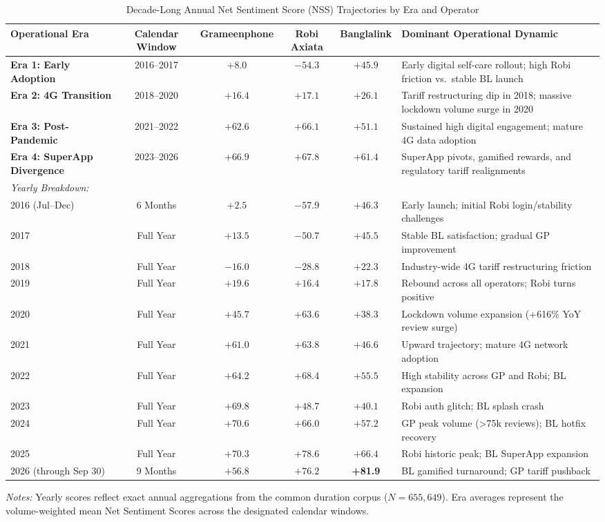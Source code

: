 \documentclass[review,12pt,authoryear]{elsarticle}
\begin{document}
\begin{table}[t]
\centering
\caption{Decade-Long Annual Net Sentiment Score (NSS) Trajectories by Era and Operator}
\label{tab:eras}
\footnotesize
\setlength{\tabcolsep}{8pt}
\begin{tabularx}{\textwidth}{@{}lccccX@{}}
\toprule
Operational Era & Calendar Window & Grameenphone & Robi Axiata & Banglalink & Dominant Operational Dynamic \\
\midrule
\textbf{Era 1: Early Adoption} & 2016--2017 & $+8.0$ & $-54.3$ & $+45.9$ & Early digital self-care rollout; high Robi friction vs.\ stable BL launch \\
\textbf{Era 2: 4G Transition} & 2018--2020 & $+16.4$ & $+17.1$ & $+26.1$ & Tariff restructuring dip in 2018; massive lockdown volume surge in 2020 \\
\textbf{Era 3: Post-Pandemic} & 2021--2022 & $+62.6$ & $+66.1$ & $+51.1$ & Sustained high digital engagement; mature 4G data adoption \\
\textbf{Era 4: SuperApp Divergence} & 2023--2026 & $+66.9$ & $+67.8$ & $+61.4$ & SuperApp pivots, gamified rewards, and regulatory tariff realignments \\
\midrule
\textit{Yearly Breakdown:} & & & & & \\
2016 (Jul--Dec) & 6 Months & $+2.5$ & $-57.9$ & $+46.3$ & Early launch; initial Robi login/stability challenges \\
2017 & Full Year & $+13.5$ & $-50.7$ & $+45.5$ & Stable BL satisfaction; gradual GP improvement \\
2018 & Full Year & $-16.0$ & $-28.8$ & $+22.3$ & Industry-wide 4G tariff restructuring friction \\
2019 & Full Year & $+19.6$ & $+16.4$ & $+17.8$ & Rebound across all operators; Robi turns positive \\
2020 & Full Year & $+45.7$ & $+63.6$ & $+38.3$ & Lockdown volume expansion (+616\% YoY review surge) \\
2021 & Full Year & $+61.0$ & $+63.8$ & $+46.6$ & Upward trajectory; mature 4G network adoption \\
2022 & Full Year & $+64.2$ & $+68.4$ & $+55.5$ & High stability across GP and Robi; BL expansion \\
2023 & Full Year & $+69.8$ & $+48.7$ & $+40.1$ & Robi auth glitch; BL splash crash \\
2024 & Full Year & $+70.6$ & $+66.0$ & $+57.2$ & GP peak volume (>75k reviews); BL hotfix recovery \\
2025 & Full Year & $+70.3$ & $+78.6$ & $+66.4$ & Robi historic peak; BL SuperApp expansion \\
2026 (through Sep 30) & 9 Months & $+56.8$ & $+76.2$ & \textbf{+81.9} & BL gamified turnaround; GP tariff pushback \\
\bottomrule
\end{tabularx}
\vspace{0.4em}
\parbox{\textwidth}{\footnotesize \textit{Notes:} Yearly scores reflect exact annual aggregations from the common duration corpus ($N = 655{,}649$). Era averages represent the volume-weighted mean Net Sentiment Scores across the designated calendar windows.}
\end{table}
\end{document}
